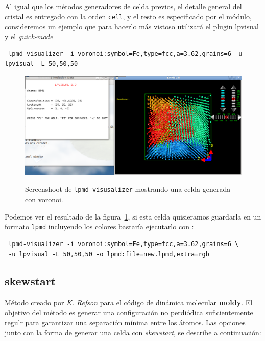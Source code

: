Al igual que los m\'etodos generadores de celda previos, el detalle general del cristal es entregado con la orden \verb|cell|, y el resto es especificado por el m\'odulo, consideremos un ejemplo que para hacerlo m\'as vistoso utilizar\'a el plugin lpvisual y el \textit{quick-mode}

\begin{verbatim}
 lpmd-visualizer -i voronoi:symbol=Fe,type=fcc,a=3.62,grains=6 -u lpvisual -L 50,50,50
\end{verbatim}

\begin{figure}[h!]
 \centering
 \includegraphics[scale=.35]{voronoi-1.png}
 \label{fig:voronoi-1}
 \caption{Screenshoot de \texttt{lpmd-visusalizer} mostrando una celda generada con voronoi.}
\end{figure}

Podemos ver el resultado de la figura~\ref{fig:voronoi-1}, si esta celda quisieramos guardarla en un formato \verb|lpmd| incluyendo los colores bastar\'ia ejecutarlo con :

 \begin{verbatim}
 lpmd-visualizer -i voronoi:symbol=Fe,type=fcc,a=3.62,grains=6 \
 -u lpvisual -L 50,50,50 -o lpmd:file=new.lpmd,extra=rgb
\end{verbatim}



\subsection{skewstart}
M\'etodo creado por \textit{K. Refson} para el c\'odigo de din\'amica molecular \textbf{moldy}. El objetivo del m\'etodo es generar una configuraci\'on no perdi\'odica suficientemente regulr para garantizar una separaci\'on m\'inima entre los \'atomos. Las opciones junto con la forma de generar una celda con \textit{skewstart}, se describe a continuaci\'on:

